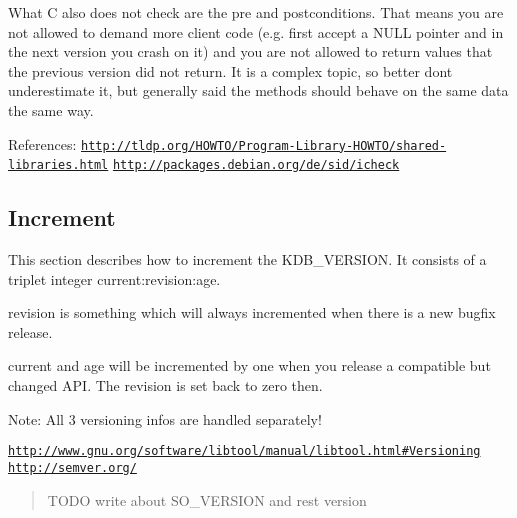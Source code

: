 What C also does not check are the pre and postconditions. That means you are not allowed to demand more client code (e.\+g. first accept a N\+U\+LL pointer and in the next version you crash on it) and you are not allowed to return values that the previous version did not return. It is a complex topic, so better don\textquotesingle{}t underestimate it, but generally said the methods should behave on the same data the same way.

References\+: \href{http://tldp.org/HOWTO/Program-Library-HOWTO/shared-libraries.html}{\tt http\+://tldp.\+org/\+H\+O\+W\+T\+O/\+Program-\/\+Library-\/\+H\+O\+W\+T\+O/shared-\/libraries.\+html} \href{http://packages.debian.org/de/sid/icheck}{\tt http\+://packages.\+debian.\+org/de/sid/icheck}

\subsection*{Increment}

This section describes how to increment the {\ttfamily K\+D\+B\+\_\+\+V\+E\+R\+S\+I\+ON}. It consists of a triplet integer {\ttfamily current\+:revision\+:age}.

{\ttfamily revision} is something which will always incremented when there is a new bugfix release.

{\ttfamily current} and {\ttfamily age} will be incremented by one when you release a compatible but changed A\+PI. The revision is set back to zero then.

Note\+: All 3 versioning infos are handled separately!

\href{http://www.gnu.org/software/libtool/manual/libtool.html#Versioning}{\tt http\+://www.\+gnu.\+org/software/libtool/manual/libtool.\+html\#\+Versioning} \href{http://semver.org/}{\tt http\+://semver.\+org/}

\begin{quote}
T\+O\+DO write about S\+O\+\_\+\+V\+E\+R\+S\+I\+ON and rest version\end{quote}

